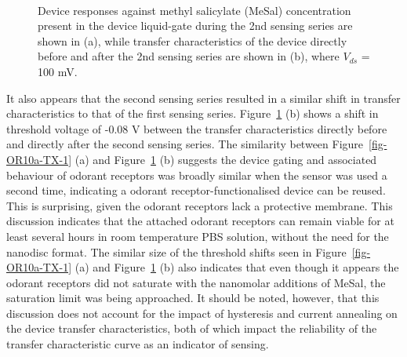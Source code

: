 \documentclass[
  a4paper,
]{scrbook}
\begin{document}
\begin{figure}
\begin{minipage}[t]{0.45\linewidth}
{{}

}

\end{minipage}%
%
\begin{minipage}[t]{0.01\linewidth}

{\centering 

~

}

\end{minipage}%

\caption[Device responses against methyl salicylate concentration
present in the device liquid-gate during the 2nd sensing series,
alongside transfer characteristics of the device directly before and
after the 2nd sensing series.]{\label{fig-OR10a-signal-TX}Device
responses against methyl salicylate (MeSal) concentration present in the
device liquid-gate during the 2nd sensing series are shown in (a), while
transfer characteristics of the device directly before and after the 2nd
sensing series are shown in (b), where \(V_{ds}\) = 100 mV.}

\end{figure}

It also appears that the second sensing series resulted in a similar
shift in transfer characteristics to that of the first sensing series.
Figure~\ref{fig-OR10a-signal-TX} (b) shows a shift in threshold voltage
of -0.08 V between the transfer characteristics directly before and
directly after the second sensing series. The similarity between
Figure~\ref{fig-OR10a-TX-1} (a) and Figure~\ref{fig-OR10a-signal-TX} (b)
suggests the device gating and associated behaviour of odorant receptors
was broadly similar when the sensor was used a second time, indicating a
odorant receptor-functionalised device can be reused. This is
surprising, given the odorant receptors lack a protective membrane. This
discussion indicates that the attached odorant receptors can remain
viable for at least several hours in room temperature PBS solution,
without the need for the nanodisc format. The similar size of the
threshold shifts seen in Figure~\ref{fig-OR10a-TX-1} (a) and
Figure~\ref{fig-OR10a-signal-TX} (b) also indicates that even though it
appears the odorant receptors did not saturate with the nanomolar
additions of MeSal, the saturation limit was being approached. It should
be noted, however, that this discussion does not account for the impact
of hysteresis and current annealing on the device transfer
characteristics, both of which impact the reliability of the transfer
characteristic curve as an indicator of sensing.
\end{document}
